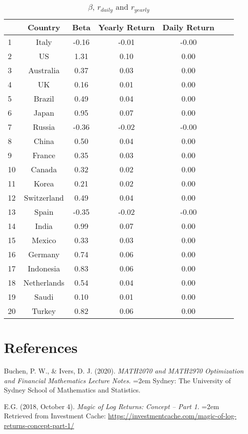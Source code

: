 \documentclass[
]{article}
\begin{document}
\begin{table}[!htb]
\caption{$\beta$, $r_{daily}$ and $r_{yearly}$}
{\begin{tabular}{lcccccc} 
    \hline
 & Country & Beta & Yearly Return & Daily Return \\ 
  \hline
1 & Italy & -0.16 & -0.01 & -0.00 \\ 
  2 & US & 1.31 & 0.10 & 0.00 \\ 
  3 & Australia & 0.37 & 0.03 & 0.00 \\ 
  4 & UK & 0.16 & 0.01 & 0.00 \\ 
  5 & Brazil & 0.49 & 0.04 & 0.00 \\ 
  6 & Japan & 0.95 & 0.07 & 0.00 \\ 
  7 & Russia & -0.36 & -0.02 & -0.00 \\ 
  8 & China & 0.50 & 0.04 & 0.00 \\ 
  9 & France & 0.35 & 0.03 & 0.00 \\ 
  10 & Canada & 0.32 & 0.02 & 0.00 \\ 
  11 & Korea & 0.21 & 0.02 & 0.00 \\ 
  12 & Switzerland & 0.49 & 0.04 & 0.00 \\ 
  13 & Spain & -0.35 & -0.02 & -0.00 \\ 
  14 & India & 0.99 & 0.07 & 0.00 \\ 
  15 & Mexico & 0.33 & 0.03 & 0.00 \\ 
  16 & Germany & 0.74 & 0.06 & 0.00 \\ 
  17 & Indonesia & 0.83 & 0.06 & 0.00 \\ 
  18 & Netherlands & 0.54 & 0.04 & 0.00 \\ 
  19 & Saudi & 0.10 & 0.01 & 0.00 \\ 
  20 & Turkey & 0.82 & 0.06 & 0.00 \\ 
   \hline
\end{tabular}}\label{beta_countries_name}
\end{table}

\hypertarget{references}{%
\section{References}\label{references}}

Buchen, P. W., \& Ivers, D. J. (2020). \emph{MATH2070 and MATH2970
Optimization and Financial Mathematics Lecture Notes.} \hangindent=2em
Sydney: The University of Sydney School of Mathematics and Statistics.

E.G. (2018, October 4). \emph{Magic of Log Returns: Concept -- Part 1.}
\hangindent=2em Retrieved from Investment Cache:
\url{https://investmentcache.com/magic-of-log-returns-concept-part-1/}
\end{document}
